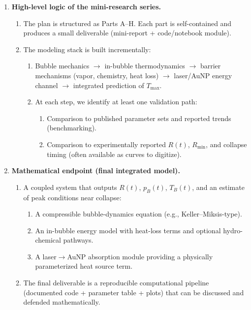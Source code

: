 \documentclass[11pt]{article}
\begin{document}
\begin{enumerate}
		\item \textbf{High-level logic of the mini-research series.}
		\begin{enumerate}
			\item The plan is structured as Parts A--H. Each part is self-contained and produces a small deliverable (mini-report + code/notebook module).
			\item The modeling stack is built incrementally:
			\begin{enumerate}
				\item Bubble mechanics \(\rightarrow\) in-bubble thermodynamics \(\rightarrow\) barrier mechanisms (vapor, chemistry, heat loss) \(\rightarrow\) laser/AuNP energy channel \(\rightarrow\) integrated prediction of \(T_{\max}\).
				\item At each step, we identify at least one validation path:
				\begin{enumerate}
					\item Comparison to published parameter sets and reported trends (benchmarking).
					\item Comparison to experimentally reported \(R(t)\), \(R_{\min}\), and collapse timing (often available as curves to digitize).
				\end{enumerate}
			\end{enumerate}
		\end{enumerate}
		
		\item \textbf{Mathematical endpoint (final integrated model).}
		\begin{enumerate}
			\item A coupled system that outputs \(R(t)\), \(p_B(t)\), \(T_B(t)\), and an estimate of peak conditions near collapse:
			\begin{enumerate}
				\item A compressible bubble-dynamics equation (e.g., Keller--Miksis-type).
				\item An in-bubble energy model with heat-loss terms and optional hydro-chemical pathways.
				\item A laser\(\rightarrow\)AuNP absorption module providing a physically parameterized heat source term.
			\end{enumerate}
			\item The final deliverable is a reproducible computational pipeline (documented code + parameter table + plots) that can be discussed and defended mathematically.
		\end{enumerate}
		
	\end{enumerate}
	\newpage
	
\end{document}
